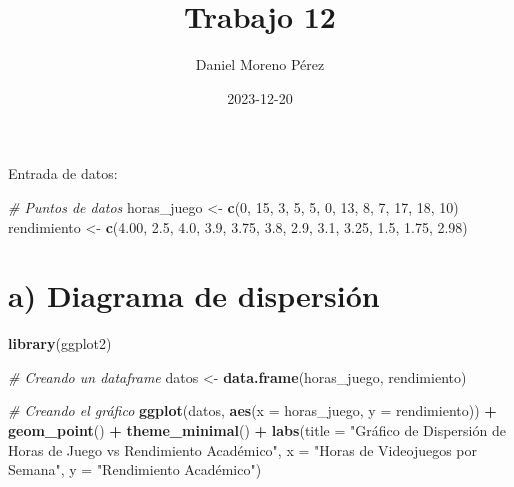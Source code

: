 \documentclass[
]{article}
\title{Trabajo 12}
\author{Daniel Moreno Pérez}
\date{2023-12-20}
\newenvironment{Shaded}{\begin{snugshade}}{\end{snugshade}}
\newcommand{\AttributeTok}[1]{\textcolor[rgb]{0.13,0.29,0.53}{#1}}
\newcommand{\CommentTok}[1]{\textcolor[rgb]{0.56,0.35,0.01}{\textit{#1}}}
\newcommand{\DecValTok}[1]{\textcolor[rgb]{0.00,0.00,0.81}{#1}}
\newcommand{\FloatTok}[1]{\textcolor[rgb]{0.00,0.00,0.81}{#1}}
\newcommand{\FunctionTok}[1]{\textcolor[rgb]{0.13,0.29,0.53}{\textbf{#1}}}
\newcommand{\NormalTok}[1]{#1}
\newcommand{\OtherTok}[1]{\textcolor[rgb]{0.56,0.35,0.01}{#1}}
\newcommand{\SpecialCharTok}[1]{\textcolor[rgb]{0.81,0.36,0.00}{\textbf{#1}}}
\newcommand{\StringTok}[1]{\textcolor[rgb]{0.31,0.60,0.02}{#1}}
\begin{document}
\maketitle

{
\setcounter{tocdepth}{2}
\tableofcontents
}
Entrada de datos:

\begin{Shaded}
\begin{Highlighting}[]
\CommentTok{\# Puntos de datos}
\NormalTok{horas\_juego }\OtherTok{\textless{}{-}} \FunctionTok{c}\NormalTok{(}\DecValTok{0}\NormalTok{, }\DecValTok{15}\NormalTok{, }\DecValTok{3}\NormalTok{, }\DecValTok{5}\NormalTok{, }\DecValTok{5}\NormalTok{, }\DecValTok{0}\NormalTok{, }\DecValTok{13}\NormalTok{, }\DecValTok{8}\NormalTok{, }\DecValTok{7}\NormalTok{, }\DecValTok{17}\NormalTok{, }\DecValTok{18}\NormalTok{, }\DecValTok{10}\NormalTok{)}
\NormalTok{rendimiento }\OtherTok{\textless{}{-}} \FunctionTok{c}\NormalTok{(}\FloatTok{4.00}\NormalTok{, }\FloatTok{2.5}\NormalTok{, }\FloatTok{4.0}\NormalTok{, }\FloatTok{3.9}\NormalTok{, }\FloatTok{3.75}\NormalTok{, }\FloatTok{3.8}\NormalTok{, }\FloatTok{2.9}\NormalTok{, }\FloatTok{3.1}\NormalTok{, }\FloatTok{3.25}\NormalTok{, }\FloatTok{1.5}\NormalTok{, }\FloatTok{1.75}\NormalTok{, }\FloatTok{2.98}\NormalTok{)}
\end{Highlighting}
\end{Shaded}

\hypertarget{a-diagrama-de-dispersiuxf3n}{%
\section{a) Diagrama de dispersión}\label{a-diagrama-de-dispersiuxf3n}}

\begin{Shaded}
\begin{Highlighting}[]
\FunctionTok{library}\NormalTok{(ggplot2)}

\CommentTok{\# Creando un dataframe}
\NormalTok{datos }\OtherTok{\textless{}{-}} \FunctionTok{data.frame}\NormalTok{(horas\_juego, rendimiento)}

\CommentTok{\# Creando el gráfico}
\FunctionTok{ggplot}\NormalTok{(datos, }\FunctionTok{aes}\NormalTok{(}\AttributeTok{x =}\NormalTok{ horas\_juego, }\AttributeTok{y =}\NormalTok{ rendimiento)) }\SpecialCharTok{+}
  \FunctionTok{geom\_point}\NormalTok{() }\SpecialCharTok{+} 
  \FunctionTok{theme\_minimal}\NormalTok{() }\SpecialCharTok{+}
  \FunctionTok{labs}\NormalTok{(}\AttributeTok{title =} \StringTok{"Gráfico de Dispersión de Horas de Juego vs Rendimiento Académico"}\NormalTok{,}
       \AttributeTok{x =} \StringTok{"Horas de Videojuegos por Semana"}\NormalTok{,}
       \AttributeTok{y =} \StringTok{"Rendimiento Académico"}\NormalTok{)}
\end{Highlighting}
\end{Shaded}
\end{document}
